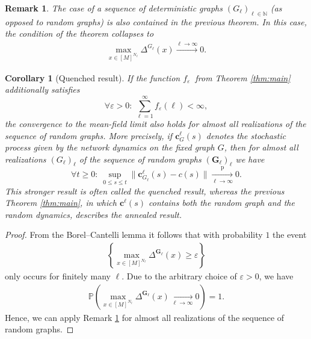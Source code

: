 \documentclass[a4paper,
               10pt,
               pdftex,
               normalheadings,
               headsepline,
               footsepline,
               headinclude,
               footinclude,
               DIV=14,
               abstracton]
{scrartcl}
\newtheorem{corollary}[theorem]{Corollary}
\newtheorem{remark}[theorem]{Remark}
\newcommand{\rv}[1]{\bm{#1}}
\newcommand{\toprob}{\overset{\mathrm{p}}{\longrightarrow}}
\newcommand{\review}[1]{{#1}}
\begin{document}
\begin{remark} \label{remark:main_deterministic}
The case of a sequence of deterministic graphs $(G_\ell)_{\ell \in \mathbb{N}}$ (as opposed to random graphs) is also contained in the previous theorem. In this case, the condition of the theorem collapses to
\begin{align}
    \max_{x \in [M]^{N_\ell}} \Delta^{G_\ell}(x) \overset{\ell \to \infty}{\longrightarrow} 0.
\end{align}
\end{remark}

\review{
\begin{corollary}[Quenched result] \label{cor:quenched}
    If the function $f_\varepsilon\ $ from Theorem \ref{thm:main} additionally satisfies
    \begin{equation}
        \forall \varepsilon > 0:\ \sum_{\ell = 1}^\infty f_\varepsilon(\ell) < \infty,
    \end{equation}
    the convergence to the mean-field limit also holds for almost all realizations of the sequence of random graphs.
    More precisely, if $\rv{c}^\ell_{G}(s)$ denotes the stochastic process given by the network dynamics on the fixed graph $G$, then for almost all realizations $(G_\ell)_\ell$ of the sequence of random graphs $(\rv{G}_\ell)_\ell$ we have 
    \begin{equation}
    \forall t \geq 0:\ \sup_{0 \leq s \leq t} \big\lVert \rv{c}^\ell_{G_\ell}(s) - c(s) \big\rVert \underset{\ell \to \infty}{\toprob} 0. \label{eq:main_convergence_quenched}
    \end{equation}
    This stronger result is often called the quenched result, whereas the previous Theorem \ref{thm:main}, in which $\rv{c}^\ell(s)$ contains both the random graph and the random dynamics, describes the annealed result.
\end{corollary}
\begin{proof}
    From the Borel--Cantelli lemma it follows that with probability $1$ the event
    \begin{align}
        \left\{ \max_{x\in [M]^{N_\ell}} \Delta^{\rv{G}_\ell}(x) \geq \varepsilon \right\}
    \end{align}
    only occurs for finitely many $\ell$.
    Due to the arbitrary choice of $\varepsilon > 0$, we have
    \begin{align}
        \mathbb{P}\left( \max_{x\in [M]^{N_\ell}} \Delta^{\rv{G}_\ell}(x) \underset{\ell \to \infty}{\longrightarrow} 0 \right) = 1.
    \end{align}
    Hence, we can apply Remark \ref{remark:main_deterministic} for almost all realizations of the sequence of random graphs.
\end{proof}
}
\end{document}
